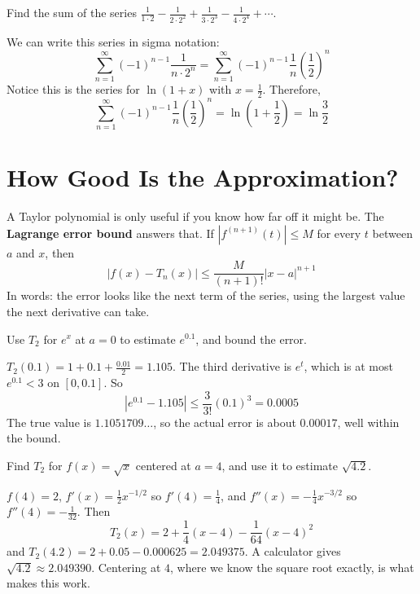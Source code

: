 \begin{Worked}
\begin{Problem}
Find the sum of the series $\frac{1}{1 \cdot 2} - \frac{1}{2 
\cdot 2^2} + \frac{1}{3 \cdot 2^3} - \frac{1}{4 \cdot 2^4} + \cdots$.
\end{Problem}
\begin{Solution}
We can write this series in sigma notation:
$$\sum_{n=1}^\infty (-1)^{n-1} \frac{1}{n \cdot 2^n} = \sum_{n = 1}^\infty 
(-1)^{n-1}\frac{1}{n} \left( \frac{1}{2} \right)^n$$
Notice this is the series for $\ln{(1 + x)}$ with $x = \frac{1}{2}$. 
Therefore, 
$$\sum_{n = 1}^\infty (-1)^{n-1}\frac{1}{n} \left( \frac{1}{2} \right)^n = \ln{\left(1 + 
\frac{1}{2}\right)} = \ln{\frac{3}{2}}$$
\end{Solution}
\end{Worked}

\section{How Good Is the Approximation?}
A Taylor polynomial is only useful if you know how far off it might be. The
\textbf{Lagrange error bound} answers that. If $|f^{(n+1)}(t)| \leq M$ for every
$t$ between $a$ and $x$, then
$$|f(x) - T_n(x)| \leq \frac{M}{(n+1)!}|x - a|^{n+1}$$
In words: the error looks like the next term of the series, using the largest
value the next derivative can take.

\begin{Worked}
\begin{Problem}
Use $T_2$ for $e^x$ at $a = 0$ to estimate $e^{0.1}$, and bound
the error.
\end{Problem}
\begin{Solution}
$T_2(0.1) = 1 + 0.1 + \frac{0.01}{2} = 1.105$. The third
derivative is $e^t$, which is at most $e^{0.1} < 3$ on $[0, 0.1]$. So
$$|e^{0.1} - 1.105| \leq \frac{3}{3!}(0.1)^3 = 0.0005$$
The true value is $1.1051709\ldots$, so the actual error is about $0.00017$, well
within the bound.
\end{Solution}
\end{Worked}

\begin{Worked}
\begin{Problem}
Find $T_2$ for $f(x) = \sqrt{x}$ centered at $a = 4$, and use it
to estimate $\sqrt{4.2}$.
\end{Problem}
\begin{Solution}
$f(4) = 2$, $f'(x) = \frac{1}{2}x^{-1/2}$ so $f'(4) = \frac{1}{4}$,
and $f''(x) = -\frac{1}{4}x^{-3/2}$ so $f''(4) = -\frac{1}{32}$. Then
$$T_2(x) = 2 + \frac{1}{4}(x-4) - \frac{1}{64}(x-4)^2$$
and $T_2(4.2) = 2 + 0.05 - 0.000625 = 2.049375$. A calculator gives
$\sqrt{4.2} \approx 2.049390$. Centering at $4$, where we know the square root
exactly, is what makes this work.
\end{Solution}
\end{Worked}

